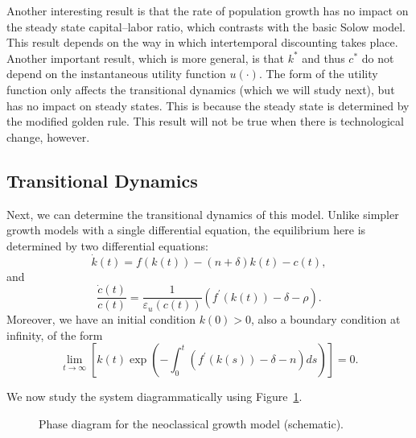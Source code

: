 \documentclass[\topdir/lecture\_notes.tex]{subfiles}
\begin{document}
Another interesting result is that the rate of population growth has no impact on the steady state capital--labor ratio, which contrasts with the basic Solow model. This result depends on the way in which intertemporal discounting takes place. Another important result, which is more general, is that $k^{*}$ and thus $c^{*}$ do not depend on the instantaneous utility function $u(\cdot)$. The form of the utility function only affects the transitional dynamics (which we will study next), but has no impact on steady states. This is because the steady state is determined by the modified golden rule. This result will not be true when there is technological change, however.

\subsection{Transitional Dynamics}
Next, we can determine the transitional dynamics of this model. Unlike simpler growth models with a single differential equation, the equilibrium here is determined by two differential equations:
\[
  \dot{k}(t)=f(k(t))-(n+\delta) k(t)-c(t),
\]
and
\[
  \frac{\dot{c}(t)}{c(t)}=\frac{1}{\varepsilon_{u}(c(t))}\left(f^{\prime}(k(t))-\delta-\rho\right).
\]
Moreover, we have an initial condition $k(0)>0$, also a boundary condition at infinity, of the form
\[
  \lim _{t \rightarrow \infty}\left[k(t) \exp \left(-\int_{0}^{t}\left(f^{\prime}(k(s))-\delta-n\right) ds\right)\right]=0.
\]

We now study the system diagrammatically using Figure~\ref{fig:phase-diagram}.

\begin{figure}[ht]
  \centering
  \caption{Phase diagram for the neoclassical growth model (schematic).}
  \label{fig:phase-diagram}
\end{figure}
\end{document}
